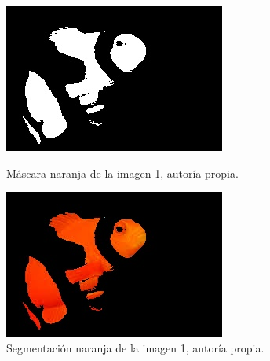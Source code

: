 \documentclass[a4paper,12pt]{article}
\begin{document}
{\vspace{0.5cm}

\begin{figure}[H]
  \centering
  \begin{minipage}[t]{0.3\textwidth}
      \centering
      \includegraphics[width=\textwidth]{processed_data/orange_mask_0.jpg} 
      \caption{Máscara naranja de la imagen 1, autoría propia.}
      \label{fig:white_mask}
  \end{minipage}
  \hfill
  \begin{minipage}[t]{0.3\textwidth}
      \centering
      \includegraphics[width=\textwidth]{processed_data/orange_segmented_0.jpg}
      \caption{Segmentación naranja de la imagen 1, autoría propia.}
      \label{fig:white_segmented}
  \end{minipage}
  
\end{figure}

}
\end{document}
